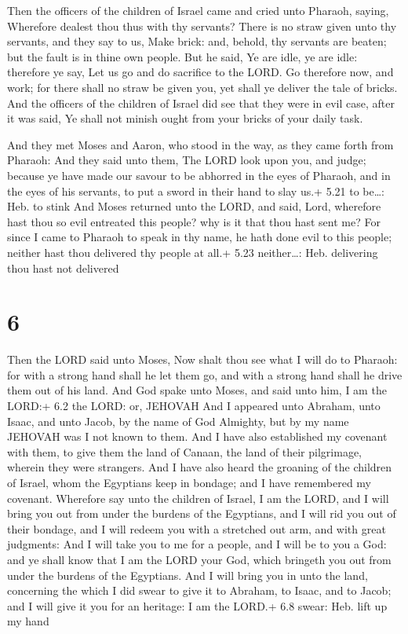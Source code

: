  Then the officers of the children of Israel came and
cried unto Pharaoh, saying, Wherefore dealest thou thus with thy
servants?  There is no straw given unto thy servants, and
they say to us, Make brick: and, behold, thy servants are beaten; but
the fault is in thine own people.  But he said, Ye are
idle, ye are idle: therefore ye say, Let us go and do sacrifice to the
LORD.  Go therefore now, and work; for there shall no straw
be given you, yet shall ye deliver the tale of bricks.  And
the officers of the children of Israel did see that they were in evil
case, after it was said, Ye shall not minish ought from your bricks of
your daily task.

 And they met Moses and Aaron, who stood in the way, as
they came forth from Pharaoh:  And they said unto them, The
LORD look upon you, and judge; because ye have made our savour to be
abhorred in the eyes of Pharaoh, and in the eyes of his servants, to put
a sword in their hand to slay us.+ 5.21 to be\ldots: Heb. to stink
 And Moses returned unto the LORD, and said, Lord,
wherefore hast thou so evil entreated this people? why is it that thou
hast sent me?  For since I came to Pharaoh to speak in thy
name, he hath done evil to this people; neither hast thou delivered thy
people at all.+ 5.23 neither\ldots: Heb. delivering thou hast not
delivered

\hypertarget{section-5}{%
\section{6}\label{section-5}}

 Then the LORD said unto Moses, Now shalt thou see what I
will do to Pharaoh: for with a strong hand shall he let them go, and
with a strong hand shall he drive them out of his land.  And
God spake unto Moses, and said unto him, I am the LORD:+ 6.2 the LORD:
or, JEHOVAH  And I appeared unto Abraham, unto Isaac, and
unto Jacob, by the name of God Almighty, but by my name JEHOVAH was I
not known to them.  And I have also established my covenant
with them, to give them the land of Canaan, the land of their
pilgrimage, wherein they were strangers.  And I have also
heard the groaning of the children of Israel, whom the Egyptians keep in
bondage; and I have remembered my covenant.  Wherefore say
unto the children of Israel, I am the LORD, and I will bring you out
from under the burdens of the Egyptians, and I will rid you out of their
bondage, and I will redeem you with a stretched out arm, and with great
judgments:  And I will take you to me for a people, and I
will be to you a God: and ye shall know that I am the LORD your God,
which bringeth you out from under the burdens of the Egyptians.
 And I will bring you in unto the land, concerning the which
I did swear to give it to Abraham, to Isaac, and to Jacob; and I will
give it you for an heritage: I am the LORD.+ 6.8 swear: Heb. lift up my
hand

